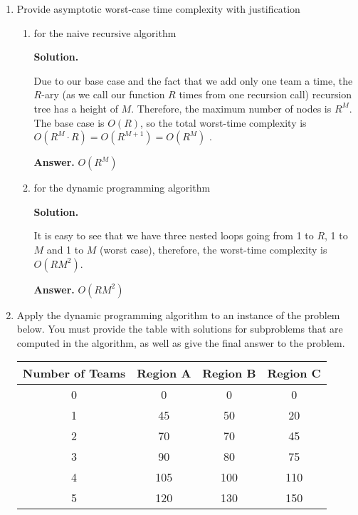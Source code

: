 \documentclass{article}
\begin{document}
\begin{enumerate}
\begin{enumerate}
\begin{lstlisting}[numbers=left,language={},style=pseudo,mathescape=true,firstnumber=1]
\end{lstlisting}
    \end{enumerate}
    \item Provide asymptotic worst-case time complexity with justification
    \begin{enumerate}
        \item for the naive recursive algorithm

        \textbf{Solution.}

        Due to our base case and the fact that we add only one team a time, the $R$-ary (as we call our function $R$ times from one recursion call) recursion tree has a height of $M$. Therefore, the maximum number of nodes is $R^M$. The base case is $O(R)$, so the total worst-time complexity is $O(R^M\cdot R) = O(R^{M + 1}) = O(R^M)$ . 

        \textbf{Answer.} $O(R^M)$
        
        \item for the dynamic programming algorithm

        \textbf{Solution.}

        It is easy to see that we have three nested loops going from 1 to $R$, 1 to $M$ and 1 to $M$ (worst case), therefore, the worst-time complexity is $O(RM^2)$.

        \textbf{Answer.} $O(RM^2)$
        
    \end{enumerate}
    \item Apply the dynamic programming algorithm to an instance of the problem below. You must provide the table with solutions for subproblems that are computed in the algorithm, as well as give the final answer to the problem.
    \begin{center}
        \begin{tabular}{|c||c|c|c|}
        \hline
        Number of Teams & Region A & Region B & Region C \\
        \hline
        \hline
        0 & 0 & 0 & 0 \\
        \hline
        1 & 45 & 50 & 20 \\
        \hline
        2 & 70 & 70 & 45 \\
        \hline
        3 & 90 & 80 & 75 \\
        \hline
        4 & 105 & 100 & 110 \\
        \hline
        5 & 120 & 130 & 150 \\
        \hline
        \end{tabular}
    \end{center}


\end{enumerate}
\end{document}
